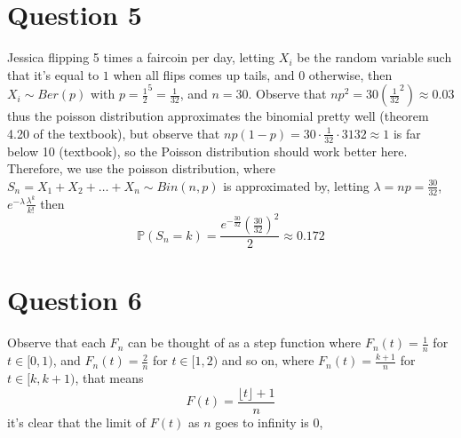 \documentclass[a4paper,11pt]{article}
\newcommand{\prob}{\mathbb{P}}
\begin{document}
\section*{Question 5}
Jessica flipping 5 times a faircoin per day, letting $X_i$ be the random variable such that it's equal to $1$ when all flips comes up tails, and $0$ otherwise, then $X_i \sim Ber(p)$ with $p = \frac{1}{2}^5 = \frac{1}{32}$, and $n = 30$. Observe that $np^2 = 30 (\frac{1}{32}^2) \approx 0.03 $ thus the poisson distribution approximates the binomial pretty well (theorem 4.20 of the textbook), but observe that $np(1-p) = 30 \cdot \frac{1}{32} \cdot {31}{32} \approx 1$ is far below 10 (textbook), so the Poisson distribution should work better here.  Therefore, we use the poisson distribution, where $S_n  = X_1 + X_2 + \ldots + X_n \sim Bin(n,p)$ is approximated by, letting $\lambda = np = \frac{30}{32}$, $e^{-\lambda} \frac{\lambda^k}{k!}$
then 
$$ \prob(S_n = k) = \frac{e^{-\frac{30}{32}} \left(\frac{30}{32}\right)^2}{2} \approx 0.172$$


\clearpage

\section*{Question 6}

Observe that each $F_n$ can be thought of as a step function where $F_n(t) = \frac{1}{n}$ for $t \in [0,1)$, and $F_n(t) = \frac{2}{n}$ for $t \in [1,2)$ and so on, where $F_n(t) = \frac{k+1}{n}$ for $t \in [k,k+1)$, that means 
$$F(t) = \frac{\lfloor t \rfloor + 1}{n}$$
it's clear that the limit of $F(t)$ as $n$ goes to infinity is $0$, 
\end{document}
